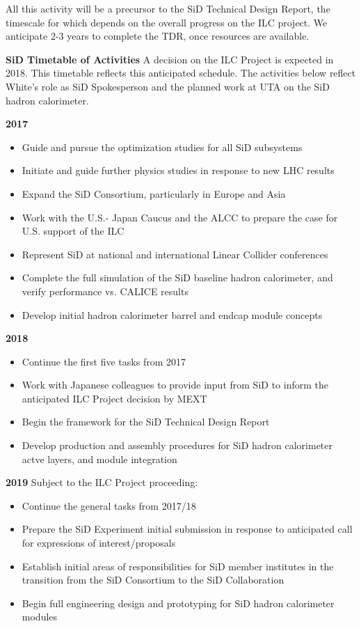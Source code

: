 All this activity will be a precursor to the SiD Technical Design Report, the timescale for which depends on the overall progress on the
ILC project. We anticipate 2-3 years to complete the TDR, once resources are available.

\textbf{SiD Timetable of Activities}
A decision on the ILC Project is expected in 2018. This timetable reflects this anticipated schedule.
The activities below reflect White's role as SiD Spokesperson and the planned work at UTA on the SiD hadron calorimeter.

\textbf{2017}
\begin{itemize}[noitemsep,nolistsep]
\item{Guide and pursue the optimization studies for all SiD subsystems}
\item{Initiate and guide further physics studies in response to new LHC results}
\item{Expand the SiD Consortium, particularly in Europe and Asia}
\item{Work with the U.S.- Japan Caucus and the ALCC to prepare the case for U.S. support of the ILC}
\item{Represent SiD at national and international Linear Collider conferences}
\item{Complete the full simulation of the SiD baseline hadron calorimeter, and verify performance vs. CALICE results}
\item{Develop initial hadron calorimeter barrel and endcap module concepts}
\end{itemize}

\textbf{2018}
\begin{itemize}[noitemsep,nolistsep]
\item{Continue the first five tasks from 2017}
\item{Work with Japanese colleagues to provide input from SiD to inform the anticipated ILC Project decision by MEXT}
\item{Begin the framework for the SiD Technical Design Report}
\item{Develop production and assembly procedures for SiD hadron calorimeter actve layers, and module integration}
\end{itemize}


\textbf{2019}
Subject to the ILC Project proceeding:
\begin{itemize}[noitemsep,nolistsep]
\item{Continue the general tasks from 2017/18}
\item{Prepare the SiD Experiment initial submission in response to anticipated call for expressions of interest/proposals}
\item{Establish initial areas of responsibilities for SiD member institutes in the transition from the SiD Consortium to the SiD Collaboration}
\item{Begin full engineering design and prototyping for SiD hadron calorimeter modules}
\end{itemize}


